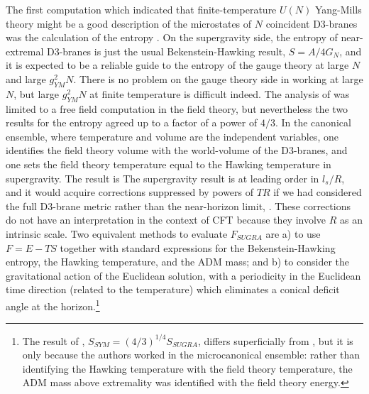 The first computation which indicated that finite-temperature $U(N)$
Yang-Mills theory might be a good description of the microstates of $N$
coincident D3-branes was the calculation of the entropy
\cite{Gubser:1996de,sunp}.  On the supergravity side, the entropy of
near-extremal D3-branes is just the usual Bekenstein-Hawking result, $S =
A/{4 G_N}$, and it is expected to be a reliable guide to the entropy of the
gauge theory at large $N$ and large $g_{YM}^2 N$.  There is no problem on
the gauge theory side in working at large $N$, but large $g_{YM}^2 N$ at
finite temperature is difficult indeed.  The analysis of
\cite{Gubser:1996de} was limited to a free field computation in the field
theory, but nevertheless the two results for the entropy agreed up to a
factor of a power of $4/3$.  In the canonical ensemble, where temperature
and volume are the independent variables, one identifies the field theory
volume with the world-volume of the D3-branes, and one sets the field
theory temperature equal to the Hawking temperature in supergravity.  The
result is
 The supergravity result is at leading order in $l_s/R$, and it would
acquire corrections suppressed by powers of $T R$ if we had considered the
full D3-brane metric rather than the near-horizon limit, \NearDThree.
These corrections do not have an interpretation in the context of CFT
because they involve $R$ as an intrinsic scale.  Two equivalent methods to
evaluate $F_{SUGRA}$ are a) to use $F = E - TS$ together with standard
expressions for the Bekenstein-Hawking entropy, the Hawking temperature,
and the ADM mass; and b) to consider the gravitational action of the
Euclidean solution, with a periodicity in the Euclidean time direction
(related to the temperature) which eliminates a conical deficit angle at
the horizon.\footnote{The result of \cite{Gubser:1996de}, $S_{SYM} =
(4/3)^{1/4} S_{SUGRA}$, differs superficially from \CanS, but it is only
because the authors worked in the microcanonical ensemble: rather than
identifying the Hawking temperature with the field theory temperature, the
ADM mass above extremality was identified with the field theory energy.}

